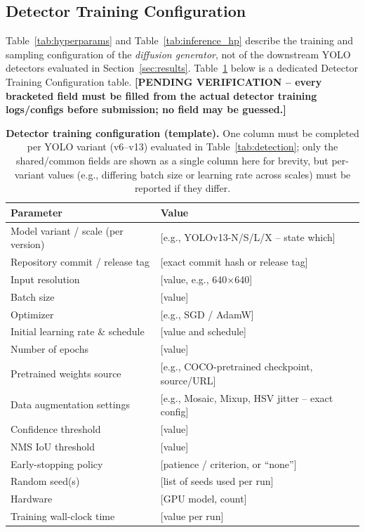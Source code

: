 \documentclass[journal]{IEEEtran}
\begin{document}
\subsection{Detector Training Configuration}
\label{sec:detector_config}

Table~\ref{tab:hyperparams} and Table~\ref{tab:inference_hp} describe the
training and sampling configuration of the \emph{diffusion generator},
not of the downstream YOLO detectors evaluated in Section~\ref{sec:results}.
Table~\ref{tab:detector_config} below is a dedicated Detector Training
Configuration table.
\textbf{[PENDING VERIFICATION -- every bracketed field must be filled from
the actual detector training logs/configs before submission; no field may
be guessed.]}

\begin{table}[t]
\centering
\caption{\textbf{Detector training configuration (template).} One column
must be completed per YOLO variant (v6--v13) evaluated in
Table~\ref{tab:detection}; only the shared/common fields are shown as a
single column here for brevity, but per-variant values (e.g., differing
batch size or learning rate across scales) must be reported if they
differ.}
\label{tab:detector_config}
\begin{tabular}{ll}
\toprule
Parameter & Value \\
\midrule
Model variant / scale (per version) & [e.g., YOLOv13-N/S/L/X -- state which] \\
Repository commit / release tag & [exact commit hash or release tag] \\
Input resolution & [value, e.g., 640$\times$640] \\
Batch size & [value] \\
Optimizer & [e.g., SGD / AdamW] \\
Initial learning rate \& schedule & [value and schedule] \\
Number of epochs & [value] \\
Pretrained weights source & [e.g., COCO-pretrained checkpoint, source/URL] \\
Data augmentation settings & [e.g., Mosaic, Mixup, HSV jitter -- exact config] \\
Confidence threshold & [value] \\
NMS IoU threshold & [value] \\
Early-stopping policy & [patience / criterion, or ``none''] \\
Random seed(s) & [list of seeds used per run] \\
Hardware & [GPU model, count] \\
Training wall-clock time & [value per run] \\
\bottomrule
\end{tabular}
\end{table}
\end{document}
